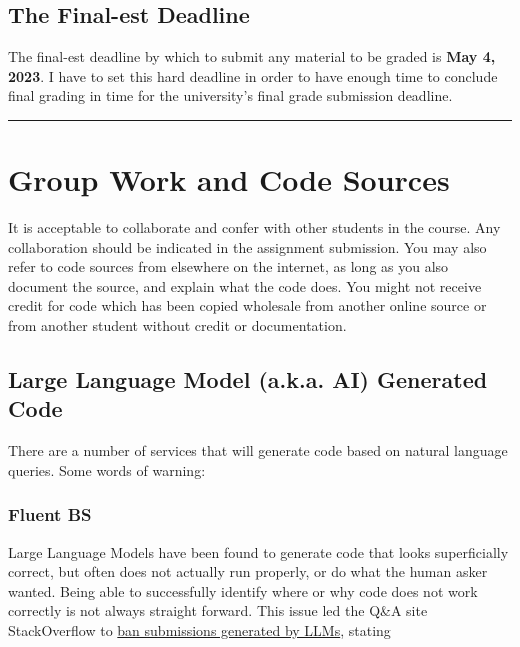 \documentclass[
  letterpaper,
  DIV=11,
  numbers=noendperiod]{scrartcl}
\begin{document}
\hypertarget{the-final-est-deadline}{%
\subsection{The Final-est Deadline}\label{the-final-est-deadline}}

The final-est deadline by which to submit any material to be graded is
\textbf{May 4, 2023}. I have to set this hard deadline in order to have
enough time to conclude final grading in time for the university's final
grade submission deadline.

\begin{center}\rule{0.5\linewidth}{0.5pt}\end{center}

\hypertarget{group-work-and-code-sources}{%
\section{Group Work and Code
Sources}\label{group-work-and-code-sources}}

It is acceptable to collaborate and confer with other students in the
course. Any collaboration should be indicated in the assignment
submission. You may also refer to code sources from elsewhere on the
internet, as long as you also document the source, and explain what the
code does. You might not receive credit for code which has been copied
wholesale from another online source or from another student without
credit or documentation.

\hypertarget{large-language-model-a.k.a.-ai-generated-code}{%
\subsection{Large Language Model (a.k.a. AI) Generated
Code}\label{large-language-model-a.k.a.-ai-generated-code}}

There are a number of services that will generate code based on natural
language queries. Some words of warning:

\hypertarget{fluent-bs}{%
\subsubsection{Fluent BS}\label{fluent-bs}}

Large Language Models have been found to generate code that looks
superficially correct, but often does not actually run properly, or do
what the human asker wanted. Being able to successfully identify where
or why code does not work correctly is not always straight forward. This
issue led the Q\&A site StackOverflow to
\href{https://stackoverflow.com/help/gpt-policy}{ban submissions
generated by LLMs}, stating
\end{document}
